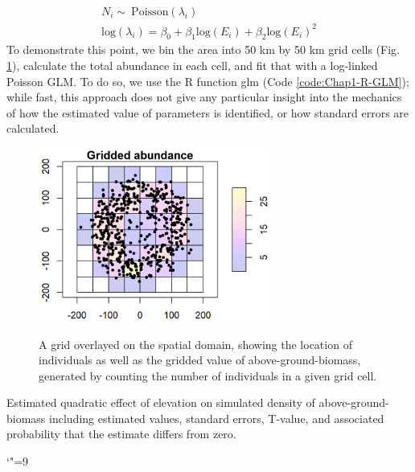 \begin{equation}
\begin{gathered}
N_i \sim\ \mathrm{Poisson}( \lambda_i ) \\
\mathrm{log}(\lambda_i) = \beta_0 + \beta_1 \mathrm{log}(E_i) + \beta_2 \mathrm{log}(E_i)^2
\end{gathered}
\end{equation}
To demonstrate this point, we bin the area into 50 km by 50 km grid cells (Fig. \ref{fig:Chap1_gridded}), calculate the total abundance in each cell, and fit that with a log-linked Poisson GLM.  To do so, we use the R function glm (Code \ref{code:Chap1-R-GLM}); while fast, this approach does not give any particular insight into the mechanics of how the estimated value of parameters is identified, or how standard errors are calculated.

\lstset{style=Rcode}


\begin{figure}[!ht]
    \caption[Gridded density of simulated above-ground-biomass]{A grid overlayed on the spatial domain, showing the location of individuals as well as the gridded value of above-ground-biomass, generated by counting the number of individuals in a given grid cell.}
    \centering
    \includegraphics[width=3in]{Chap_1/gridded_density_res50.png}
    \label{fig:Chap1_gridded}
\end{figure}

\begin{table} 
  \caption[Estimated effect of elevation in gridded density in simulation experiment]{Estimated quadratic effect of elevation on simulated density of above-ground-biomass including estimated values, standard errors, T-value, and associated probability that the estimate differs from zero.}
  \catcode`"=9
  \centering
  \label{tab:Chap1_gridded}
\end{table} 

